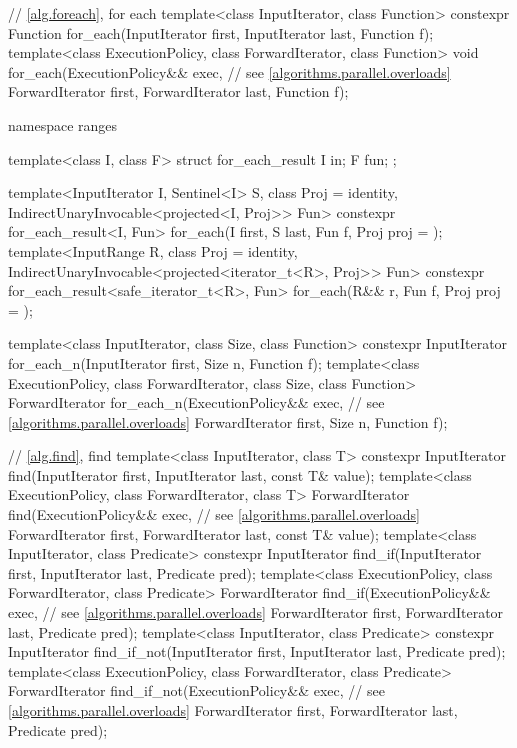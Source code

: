 \begin{codeblock}
{  // \ref{alg.foreach}, for each
  template<class InputIterator, class Function>
    constexpr Function for_each(InputIterator first, InputIterator last, Function f);
  template<class ExecutionPolicy, class ForwardIterator, class Function>
    void for_each(ExecutionPolicy&& exec, // see \ref{algorithms.parallel.overloads}
                  ForwardIterator first, ForwardIterator last, Function f);

  namespace ranges {
    template<class I, class F>
    struct for_each_result {
      I in;
      F fun;
    };

    template<InputIterator I, Sentinel<I> S, class Proj = identity,
             IndirectUnaryInvocable<projected<I, Proj>> Fun>
      constexpr for_each_result<I, Fun>
        for_each(I first, S last, Fun f, Proj proj = {});
    template<InputRange R, class Proj = identity,
             IndirectUnaryInvocable<projected<iterator_t<R>, Proj>> Fun>
      constexpr for_each_result<safe_iterator_t<R>, Fun>
        for_each(R&& r, Fun f, Proj proj = {});
  }

  template<class InputIterator, class Size, class Function>
    constexpr InputIterator for_each_n(InputIterator first, Size n, Function f);
  template<class ExecutionPolicy, class ForwardIterator, class Size, class Function>
    ForwardIterator for_each_n(ExecutionPolicy&& exec, // see \ref{algorithms.parallel.overloads}
                               ForwardIterator first, Size n, Function f);

  // \ref{alg.find}, find
  template<class InputIterator, class T>
    constexpr InputIterator find(InputIterator first, InputIterator last,
                                 const T& value);
  template<class ExecutionPolicy, class ForwardIterator, class T>
    ForwardIterator find(ExecutionPolicy&& exec, // see \ref{algorithms.parallel.overloads}
                         ForwardIterator first, ForwardIterator last,
                         const T& value);
  template<class InputIterator, class Predicate>
    constexpr InputIterator find_if(InputIterator first, InputIterator last,
                                    Predicate pred);
  template<class ExecutionPolicy, class ForwardIterator, class Predicate>
    ForwardIterator find_if(ExecutionPolicy&& exec, // see \ref{algorithms.parallel.overloads}
                            ForwardIterator first, ForwardIterator last,
                            Predicate pred);
  template<class InputIterator, class Predicate>
    constexpr InputIterator find_if_not(InputIterator first, InputIterator last,
                                        Predicate pred);
  template<class ExecutionPolicy, class ForwardIterator, class Predicate>
    ForwardIterator find_if_not(ExecutionPolicy&& exec, // see \ref{algorithms.parallel.overloads}
                                ForwardIterator first, ForwardIterator last,
                                Predicate pred);

}
\end{codeblock}
